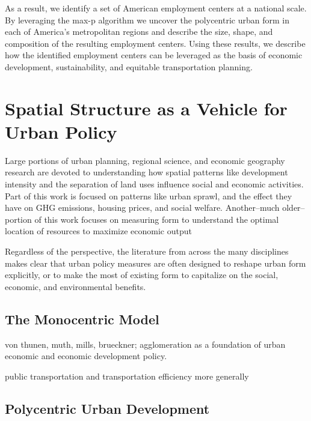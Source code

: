 \documentclass[11pt,article,oneside]{memoir}
\begin{document}
As a result, we identify a set of American employment centers at a
national scale. By leveraging the max-p algorithm we uncover the
polycentric urban form in each of America's metropolitan regions and
describe the size, shape, and composition of the resulting employment
centers. Using these results, we describe how the identified employment
centers can be leveraged as the basis of economic development,
sustainability, and equitable transportation planning.

\hypertarget{spatial-structure-as-a-vehicle-for-urban-policy}{%
\section{Spatial Structure as a Vehicle for Urban
Policy}\label{spatial-structure-as-a-vehicle-for-urban-policy}}

Large portions of urban planning, regional science, and economic
geography research are devoted to understanding how spatial patterns
like development intensity and the separation of land uses influence
social and economic activities. Part of this work is focused on patterns
like urban sprawl, and the effect they have on GHG emissions, housing
prices, and social welfare. Another--much older--portion of this work
focuses on measuring form to understand the optimal location of
resources to maximize economic output

Regardless of the perspective, the literature from across the many
disciplines makes clear that urban policy measures are often designed to
reshape urban form explicitly, or to make the most of existing form to
capitalize on the social, economic, and environmental benefits.

\hypertarget{the-monocentric-model}{%
\subsection{The Monocentric Model}\label{the-monocentric-model}}

von thunen, muth, mills, brueckner; agglomeration as a foundation of
urban economic and economic development policy.

public transportation and transportation efficiency more generally

\hypertarget{polycentric-urban-development}{%
\subsection{Polycentric Urban
Development}\label{polycentric-urban-development}}
\end{document}
